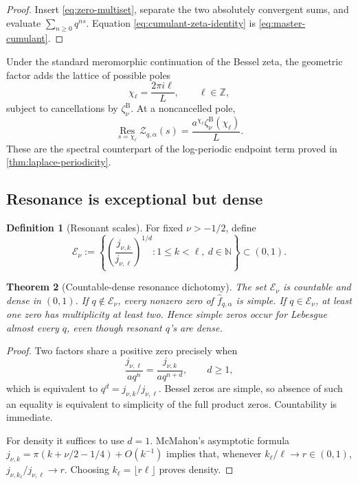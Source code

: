 \documentclass[11pt]{article}
\newtheorem{theorem}{Theorem}[section]
\theoremstyle{definition}
\newtheorem{definition}[theorem]{Definition}
\theoremstyle{remark}
\newcommand{\N}{\mathbb{N}}
\newcommand{\Zcal}{\mathcal{Z}}
\begin{document}
\begin{proof}
Insert \eqref{eq:zero-multiset}, separate the two absolutely convergent sums,
and evaluate \(\sum_{n\ge0}q^{ns}\).  Equation
\eqref{eq:cumulant-zeta-identity} is \eqref{eq:master-cumulant}.
\end{proof}

Under the standard meromorphic continuation of the Bessel zeta, the geometric
factor adds the lattice of possible poles
\begin{equation}
 \chi_\ell=\frac{2\pi i\ell}{L},\qquad \ell\in\mathbb Z,
 \label{eq:complex-dimensions}
\end{equation}
subject to cancellations by \(\zeta_\nu^{\mathrm B}\).  At a noncancelled
pole,
\begin{equation}
 \operatorname*{Res}_{s=\chi_\ell}\Zcal_{q,\alpha}(s)
 =\frac{a^{\chi_\ell}\zeta_\nu^{\mathrm B}(\chi_\ell)}{L}.
 \label{eq:complex-residue}
\end{equation}
These are the spectral counterpart of the log-periodic endpoint term proved
in \cref{thm:laplace-periodicity}.

\subsection{Resonance is exceptional but dense}

\begin{definition}[Resonant scales]
For fixed \(\nu>-1/2\), define
\begin{equation}
 \mathcal E_\nu
 :=\left\{
 \left(\frac{j_{\nu,k}}{j_{\nu,\ell}}\right)^{1/d}:
 1\le k<\ell,\ d\in\N
 \right\}\subset(0,1).
 \label{eq:resonance-set}
\end{equation}
\end{definition}

\begin{theorem}[Countable-dense resonance dichotomy]
\label{thm:resonance}
The set \(\mathcal E_\nu\) is countable and dense in \((0,1)\).  If
\(q\notin\mathcal E_\nu\), every nonzero zero of
\(\widehat f_{q,\alpha}\) is simple.  If \(q\in\mathcal E_\nu\), at least one
zero has multiplicity at least two.  Hence simple zeros occur for Lebesgue
almost every \(q\), even though resonant \(q\)'s are dense.
\end{theorem}

\begin{proof}
Two factors share a positive zero precisely when
\[
 \frac{j_{\nu,\ell}}{aq^n}
 =\frac{j_{\nu,k}}{aq^{n+d}},
 \qquad d\ge1,
\]
which is equivalent to \(q^d=j_{\nu,k}/j_{\nu,\ell}\).  Bessel zeros are
simple, so absence of such an equality is equivalent to simplicity of the
full product zeros.  Countability is immediate.

For density it suffices to use \(d=1\).  McMahon's asymptotic formula \cite{Watson,DLMF}
\(j_{\nu,k}=\pi(k+\nu/2-1/4)+O(k^{-1})\) implies that, whenever
\(k_\ell/\ell\to r\in(0,1)\),
\(j_{\nu,k_\ell}/j_{\nu,\ell}\to r\).  Choosing
\(k_\ell=\lfloor r\ell\rfloor\) proves density.
\end{proof}
\end{document}
